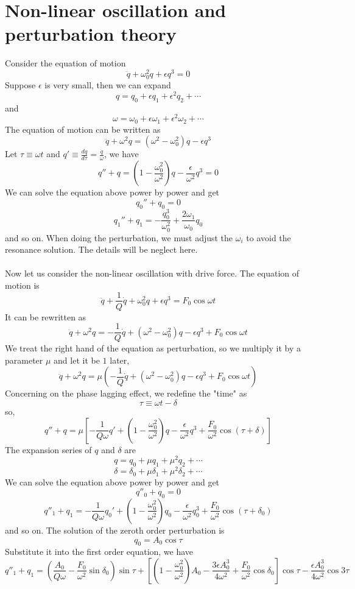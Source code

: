 \section{Non-linear oscillation and perturbation theory}
Consider the equation of motion
\[\ddot{q} + \omega_0^2 q + \epsilon q^3 = 0\]
Suppose $\epsilon$ is very small, then we can expand
\[q = q_0 + \epsilon q_1 + \epsilon^2 q_2 + \cdots\]
and
\[\omega = \omega_0 + \epsilon \omega_1 + \epsilon^2 \omega_2 + \cdots\]
The equation of motion can be written as
\[\ddot{q} + \omega^2 q = (\omega^2 -\omega_0^2)q - \epsilon q^3\]
Let $\tau \equiv \omega t$ and $q' \equiv \frac{dq}{d\tau} = \frac{\dot{q}}{\omega}$, we have
\[q'' + q = (1- \frac{\omega_0^2}{\omega^2})q - \frac{\epsilon}{\omega^2} q^3 = 0\]
We can solve the equation above power by power and get
\[q_0'' + q_0 = 0\]
\[q_1'' + q_1 = -\frac{q_0^3}{\omega_0^2} + \frac{2\omega_1}{\omega_0}q_0\]
and so on. When doing the perturbation, we must adjust the $\omega_i$ to avoid the resonance solution. The details will be neglect here.\\ \\
Now let us consider the non-linear oscillation with drive force. The equation of motion is
\[\ddot{q} + \frac{1}{Q}\dot{q} + \omega_0^2 q + \epsilon q^3 = F_0 \cos \omega t\]
It can be rewritten as
\[\ddot{q} + \omega^2 q = - \frac{1}{Q} \dot{q} + (\omega^2 - \omega_0^2)q - \epsilon q^3 + F_0\cos\omega t\]
We treat the right hand of the equation as perturbation, so we multiply it by a parameter $\mu$ and let it be $1$ later,
\[\ddot{q} + \omega^2 q = \mu \left (- \frac{1}{Q} \dot{q} + (\omega^2 - \omega_0^2)q - \epsilon q^3 + F_0\cos\omega t \right )\]
Concerning on the phase lagging effect, we redefine the "time" as 
\[\tau \equiv \omega t - \delta\]
so,
\[q'' + q = \mu \left [ -\frac{1}{Q\omega} q' + \left ( 1- \frac{\omega_0^2}{\omega^2} \right ) q - \frac{\epsilon}{\omega^2} q^3 + \frac{F_0}{\omega^2} \cos (\tau + \delta) \right ]\]
The expansion series of $q$ and $\delta$ are
\[q = q_0 + \mu q_1 + \mu^2 q_2 + \cdots\]
\[\delta = \delta_0 + \mu \delta_1 + \mu^2 \delta_2 + \cdots\]
We can solve the equation above power by power and get
\[q''_0 + q_0 = 0\]
\[q''_1 + q_1 =  -\frac{1}{Q\omega} q_0' + \left ( 1- \frac{\omega_0^2}{\omega^2} \right ) q_0 - \frac{\epsilon}{\omega^2} q_0^3 + \frac{F_0}{\omega^2} \cos (\tau + \delta_0)\]
and so on. The solution of the zeroth order perturbation is
\[q_0 = A_0 \cos\tau\]
Substitute it into the first order equation, we have
\[q''_1 + q_1 = \left ( \frac{A_0}{Q\omega} - \frac{F_0}{\omega^2} \sin\delta_0 \right ) \sin\tau + \left [ \left ( 1 - \frac{\omega_0^2}{\omega^2}\right ) A_0 - \frac{3\epsilon A_0^3}{4\omega^2} + \frac{F_0}{\omega^2}\cos\delta_0 \right ] \cos\tau - \frac{\epsilon A_0^3}{4\omega^2} \cos 3\tau\]
